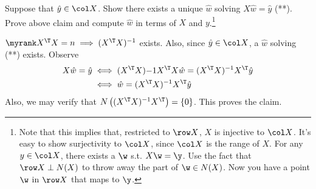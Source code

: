 %
\begin{exercise} \label{exer:restricted-bijection}
Suppose that $\hat y \in \col X$. Show there exists a unique $\hat w$ solving $X\hat w = \hat y$ (**). 
Prove above claim and compute $\hat w$ in terms of $X$ and $y$.\footnote{Note that this implies that, restricted to $\row X$, $X$ is injective to $\col X$. It's easy to show surjectivity to $\col X$, since $\col X$ is the range of $X$. For any $y\in \col X$, there exists a $\w$ s.t. $X\w = \y$. Use the fact that $\row X \perp N(X)$ to throw away the part of $\w\in N(X)$. Now you have a point $\w$ in $\row X$ that maps to $\y$.}
\end{exercise}

\begin{solution}
 $\myrank X^\T X = n \implies (X^\T X)^{-1}$ exists. Also, since $\hat y\in \col X$, a $\hat w$ solving (**) exists. Observe
 \begin{align}
 X \hat w = \hat y & \iff (X^\T X){-1} X^\T X\hat w = (X^\T X)^{-1} X^\T \hat y\\
 & \iff \hat w = (X^\T X)^{-1} X^\T \hat y
 \end{align}
 Also, we may verify that $N\left((X^\T X)^{-1} X^\T\right) = \{0\}$. This proves the claim. 
\end{solution}